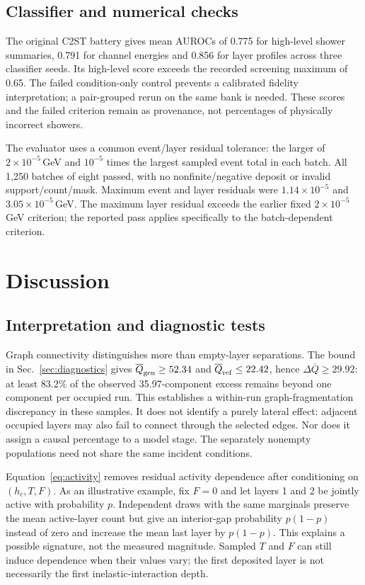 \documentclass[11pt]{article}
\begin{document}
\subsection{Classifier and numerical checks}

The original C2ST battery gives mean AUROCs of 0.775 for high-level shower summaries, 0.791 for channel energies and 0.856 for layer profiles across three classifier seeds. Its high-level score exceeds the recorded screening maximum of 0.65. The failed condition-only control prevents a calibrated fidelity interpretation; a pair-grouped rerun on the same bank is needed. These scores and the failed criterion remain as provenance, not percentages of physically incorrect showers.

The evaluator uses a common event/layer residual tolerance: the larger of $2\times10^{-5}$\,GeV and $10^{-5}$ times the largest sampled event total in each batch. All 1,250 batches of eight passed, with no nonfinite/negative deposit or invalid support/count/mask. Maximum event and layer residuals were $1.14\times10^{-5}$ and $3.05\times10^{-5}$\,GeV. The maximum layer residual exceeds the earlier fixed $2\times10^{-5}$\,GeV criterion; the reported pass applies specifically to the batch-dependent criterion.

\section{Discussion}
\label{sec:discussion}

\subsection{Interpretation and diagnostic tests}

Graph connectivity distinguishes more than empty-layer separations. The bound in Sec.~\ref{sec:diagnostics} gives $\overline Q_{\rm gen}\geq52.34$ and $\overline Q_{\rm ref}\leq22.42$, hence $\Delta\overline Q\geq29.92$: at least 83.2\% of the observed 35.97-component excess remains beyond one component per occupied run. This establishes a within-run graph-fragmentation discrepancy in these samples. It does not identify a purely lateral effect: adjacent occupied layers may also fail to connect through the selected edges. Nor does it assign a causal percentage to a model stage. The separately nonempty populations need not share the same incident conditions.

Equation~\eqref{eq:activity} removes residual activity dependence after conditioning on $(h_c,T,F)$. As an illustrative example, fix $F=0$ and let layers 1 and 2 be jointly active with probability $p$. Independent draws with the same marginals preserve the mean active-layer count but give an interior-gap probability $p(1-p)$ instead of zero and increase the mean last layer by $p(1-p)$. This explains a possible signature, not the measured magnitude. Sampled $T$ and $F$ can still induce dependence when their values vary; the first deposited layer is not necessarily the first inelastic-interaction depth.
\end{document}
